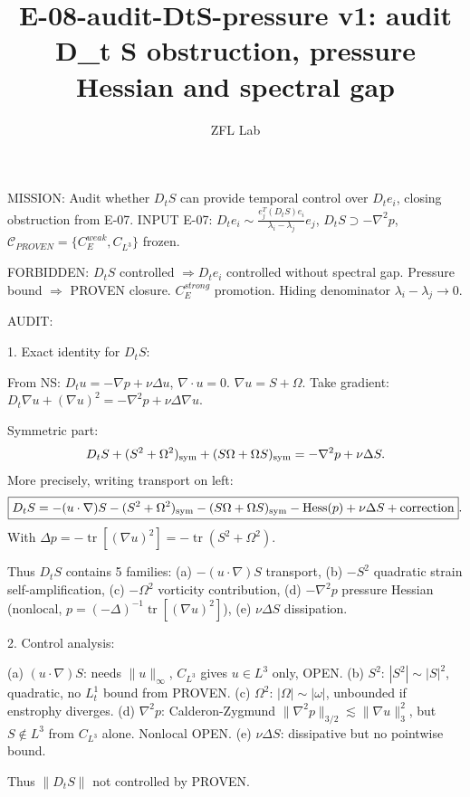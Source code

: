 \documentclass[11pt]{article}
\title{E-08-audit-DtS-pressure v1: audit D\_t S obstruction, pressure Hessian and spectral gap}
\author{ZFL Lab}
\begin{document}
\maketitle

MISSION: Audit whether $D_t S$ can provide temporal control over $D_t e_i$, closing obstruction from E-07.
INPUT E-07: $D_t e_i \sim \frac{e_j^T(D_t S)e_i}{\lambda_i-\lambda_j}e_j$, $D_t S\supset -\nabla^2 p$, $\mathcal{C}_{PROVEN}=\{C_E^{weak},C_{L^3}\}$ frozen.

FORBIDDEN:
$D_t S$ controlled $\Rightarrow D_t e_i$ controlled without spectral gap.
Pressure bound $\Rightarrow$ PROVEN closure.
$C_E^{strong}$ promotion.
Hiding denominator $\lambda_i-\lambda_j\to0$.

AUDIT:

1. Exact identity for $D_t S$:

From NS: $D_t u = -\nabla p + \nu\Delta u$, $\nabla\cdot u=0$.
$\nabla u = S+\Omega$.
Take gradient: $D_t\nabla u + (\nabla u)^2 = -\nabla^2 p + \nu\Delta\nabla u$.

Symmetric part:
\begin{equation*}
D_t S + (S^2+\Omega^2)_{\rm sym} + (S\Omega+\Omega S)_{\rm sym} = -\nabla^2 p + \nu\Delta S.
\end{equation*}
More precisely, writing transport on left:
\begin{equation*}
\boxed{D_t S = -(u\cdot\nabla)S -(S^2+\Omega^2)_{\rm sym} - (S\Omega+\Omega S)_{\rm sym} - {\rm Hess}(p) + \nu\Delta S + {\rm correction}}.
\end{equation*}
With $\Delta p = -\operatorname{tr}[(\nabla u)^2] = -\operatorname{tr}(S^2+\Omega^2)$.

Thus $D_t S$ contains 5 families:
(a) $-(u\cdot\nabla)S$ transport,
(b) $-S^2$ quadratic strain self-amplification,
(c) $-\Omega^2$ vorticity contribution,
(d) $-\nabla^2 p$ pressure Hessian (nonlocal, $p=(-\Delta)^{-1}\operatorname{tr}[(\nabla u)^2]$),
(e) $\nu\Delta S$ dissipation.

2. Control analysis:

(a) $(u\cdot\nabla)S$: needs $\|u\|_\infty$, $C_{L^3}$ gives $u\in L^3$ only, OPEN.
(b) $S^2$: $|S^2|\sim|S|^2$, quadratic, no $L^1_t$ bound from PROVEN.
(c) $\Omega^2$: $|\Omega|\sim|\omega|$, unbounded if enstrophy diverges.
(d) $\nabla^2 p$: Calderon-Zygmund $\|\nabla^2 p\|_{3/2}\lesssim \|\nabla u\|_3^2$, but $S\notin L^3$ from $C_{L^3}$ alone. Nonlocal OPEN.
(e) $\nu\Delta S$: dissipative but no pointwise bound.

Thus $\|D_t S\|$ not controlled by PROVEN.
\end{document}
